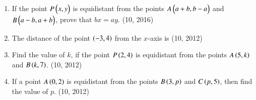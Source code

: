 \begin{enumerate}[label=\thesubsection.\arabic*, ref=\thesubsection.\theenumi]
    \item If the point $P \begin{pmatrix}x, y\end{pmatrix}$ is equidistant from the points $A \begin{pmatrix}a+b, b-a\end{pmatrix}$ and $B \begin{pmatrix}a-b, a+b\end{pmatrix}$, prove that $bx = ay$. \hfill (10, 2016)
\item The distance of the point $\left(-3,4\right)$ from the $x$-axis is
\hfill (10, 2012)
\item Find the value of $k$, if the point $P\left(2,4\right)$ is equidistant from the points $A\left(5,k\right)$ and $B\left(k,7\right)$. 
\hfill (10, 2012)
\item If a point $A\left(0,2\right)$ is equidistant from the points $B\left(3,p\right)$ and $C\left(p,5\right)$, then find the value of $p$. 
\hfill (10, 2012)
\end{enumerate}
